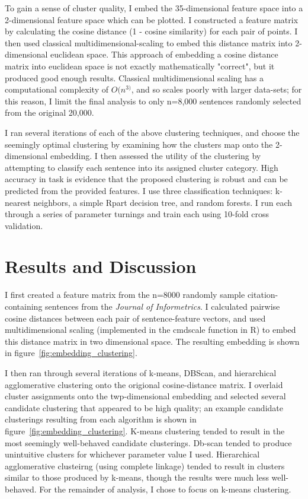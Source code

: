 \documentclass[
10pt, %
a4paper, %
oneside, %
headinclude,footinclude, %
BCOR5mm, %
]{scrartcl}
\begin{document}
To gain a sense of cluster quality, I embed the 35-dimensional feature space into a 2-dimensional feature space which can be plotted. I constructed a feature matrix by calculating the cosine distance (1 - cosine similarity) for each pair of points. I then used classical multidimensional-scaling to embed this distance matrix into 2-dimensional euclidean space. This approach of embedding a cosine distance matrix into euclidean space is not exactly mathematically "correct", but it produced good enough results. Classical multidimensional scaling has a computational complexity of $O(n^{3)}$, and so scales poorly with larger data-sets; for this reason, I limit the final analysis to only n=8,000 sentences randomly selected from the original 20,000. 

I ran several iterations of each of the above clustering techniques, and choose the seemingly optimal clustering by examining how the clusters map onto the 2-dimensional embedding. I then assessed the utility of the clustering by attempting to classify each sentence into its assigned cluster category. High accuracy in task is evidence that the proposed clustering is robust and can be predicted from the provided features. I use three classification techniques: k-nearest neighbors, a simple Rpart decision tree, and random forests. I run each through a series of parameter turnings and train each using 10-fold cross validation. 



\section{Results and Discussion}

I first created a feature matrix from the n=8000 randomly sample citation-containing sentences from the \textit{Journal of Informetrics}. I calculated pairwise cosine distances between each pair of sentence-feature vectors, and used multidimensional scaling (implemented in the \textsf{cmdscale} function in R) to embed this distance matrix in two dimensional space. The resulting embedding is shown in figure~\ref{fig:embedding_clustering}. 

I then ran through several iterations of k-means, DBScan, and hierarchical agglomerative clustering onto the origional cosine-distance matrix. I overlaid cluster assignments onto the twp-dimensional embedding and selected several candidate clustering that appeared to be high quality; an example candidate clusterings resulting from each algorithm is shown in figure~\ref{fig:embedding_clustering}. K-means clustering tended to result in the most seemingly well-behaved candidate clusterings. Db-scan tended to produce unintuitive clusters for whichever parameter value I used. Hierarchical agglomerative clusteirng (using complete linkage) tended to result in clusters similar to those produced by k-means, though the results were much less well-behaved. For the remainder of analysis, I chose to focus on k-means clustering. 
\end{document}
